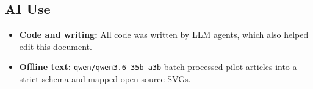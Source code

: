 \documentclass[10pt,letterpaper]{article}
\begin{document}
\subsection{AI Use}
\begin{itemize}
    \item \textbf{Code and writing:} All code was written by LLM agents, which also helped edit this document.
    \item \textbf{Offline text:} \texttt{qwen/qwen3.6-35b-a3b} batch-processed pilot articles into a strict schema and mapped open-source SVGs.
\end{itemize}
\end{document}
